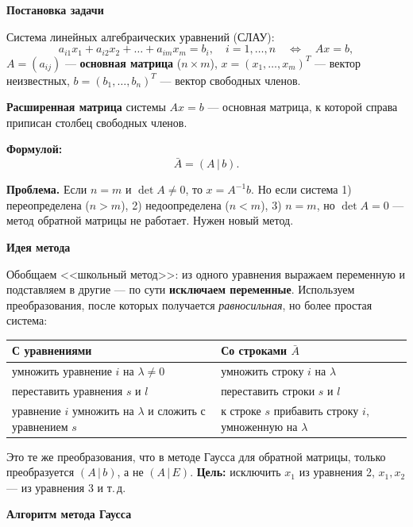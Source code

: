 \documentclass[a4paper,11pt]{article}
\newcommand{\fm}{\par\noindent\textbf{\textcolor{oprc!85!black}{Формулой:}}}
\newcommand{\podr}[1]{\par\needspace{8\baselineskip}\medskip
  {\large\bfseries\textcolor{oprc!80!black}{#1}}\par\nopagebreak\smallskip}
\begin{document}
\podr{Постановка задачи}

Система линейных алгебраических уравнений (СЛАУ):
\[
  a_{i1} x_1 + a_{i2} x_2 + \dots + a_{im} x_m = b_i, \quad i = 1, \dots, n \quad \iff \quad Ax = b,
\]
$A = (a_{ij})$ --- \textbf{основная матрица} ($n \times m$), $x = (x_1, \dots, x_m)^T$ --- вектор неизвестных,
$b = (b_1, \dots, b_n)^T$ --- вектор свободных членов.

\begin{opr}
\textbf{Расширенная матрица} системы $Ax = b$ --- основная матрица, к которой справа приписан столбец свободных членов.
\fm
\[
  \bar A = (A \,|\, b).
\]
\end{opr}

\textbf{Проблема.} Если $n = m$ и $\det A \ne 0$, то $x = A^{-1} b$. Но если система
1) переопределена ($n > m$), 2) недоопределена ($n < m$), 3) $n = m$, но $\det A = 0$ ---
метод обратной матрицы не работает. Нужен новый метод.

\podr{Идея метода}

Обобщаем <<школьный метод>>: из одного уравнения выражаем переменную и подставляем в другие --- по сути \textbf{исключаем
переменные}. Используем преобразования, после которых получается \emph{равносильная}, но более простая система:

\begin{center}
\renewcommand{\arraystretch}{1.25}
\begin{tabular}{|p{7.6cm}|p{7.6cm}|}
\hline
\textbf{С уравнениями} & \textbf{Со строками $\bar A$} \\ \hline
умножить уравнение $i$ на $\lambda \ne 0$ & умножить строку $i$ на $\lambda$ \\
переставить уравнения $s$ и $l$ & переставить строки $s$ и $l$ \\
уравнение $i$ умножить на $\lambda$ и сложить с уравнением $s$ & к строке $s$ прибавить строку $i$, умноженную на $\lambda$ \\ \hline
\end{tabular}
\end{center}

Это те же преобразования, что в методе Гаусса для обратной матрицы, только преобразуется $(A \,|\, b)$, а не $(A \,|\, E)$.
\textbf{Цель:} исключить $x_1$ из уравнения 2, $x_1, x_2$ --- из уравнения 3 и т.\,д.

\podr{Алгоритм метода Гаусса}
\end{document}
